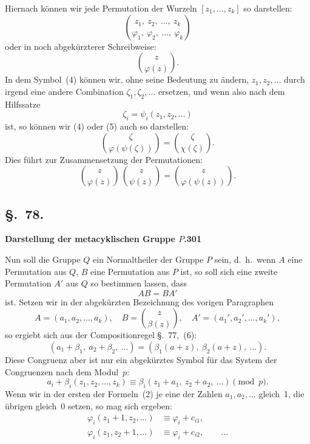 \documentclass[12pt,a4paper]{article}
\begin{document}
Hiernach k\"onnen wir jede Permutation der Wurzeln $[z_1,\ldots,z_k]$ so darstellen:
\begin{equation}
\tag{4}
\binom{z_1,\ z_2,\ \ldots,\ z_k}{\varphi_1,\ \varphi_2,\ \ldots,\ \varphi_k}
\end{equation}
oder in noch abgek\"urzterer Schreibweise:
\begin{equation}
\tag{5}
\binom{z}{\varphi(z)}.
\end{equation}
In dem Symbol~(4) k\"onnen wir, ohne seine Bedeutung zu \"andern, $z_1,z_2,\ldots$ durch irgend eine andere Combination $\zeta_1,\zeta_2,\ldots$ ersetzen, und wenn also nach dem Hilfssatze
\[
\zeta_i = \psi_i(z_1,z_2,\ldots)
\]
ist, so k\"onnen wir (4) oder (5) auch so darstellen:
\[
\binom{\zeta}{\varphi(\psi(\zeta))} = \binom{\zeta}{\chi(\zeta)}.
\]
Dies f\"uhrt zur Zusammensetzung der Permutationen:
\begin{equation}
\tag{6}
\binom{z}{\varphi(z)}\,\binom{z}{\psi(z)} = \binom{z}{\varphi(\psi(z))}.
\end{equation}

\subsection*{\S.~78.}
\textbf{Darstellung der metacyklischen Gruppe $P$.}\hfill\textbf{301}\\[4pt]

Nun soll die Gruppe $Q$ ein Normaltheiler der Gruppe $P$ sein, d.~h.\ wenn $A$ eine Permutation aus $Q$, $B$ eine Permutation aus $P$ ist, so soll sich eine zweite Permutation $A'$ aus $Q$ so bestimmen lassen, dass
\begin{equation}
\tag{1}
AB = BA'
\end{equation}
ist. Setzen wir in der abgek\"urzten Bezeichnung des vorigen Paragraphen
\[
A = (a_1,a_2,\ldots,a_k),\quad B = \binom{z}{\beta(z)},\quad A' = (a_1',a_2',\ldots,a_k'),
\]
so ergiebt sich aus der Compositionregel \S.~77,~(6):
\[
(a_1+\beta_1,\ a_2+\beta_2,\ \ldots) = (\beta_1(a+z),\ \beta_2(a+z),\ \ldots).
\]
Diese Congruenz aber ist nur ein abgek\"urztes Symbol f\"ur das System der Congruenzen nach dem Modul~$p$:
\[
a_i + \beta_i(z_1,z_2,\ldots,z_k) \equiv \beta_i(z_1+a_1,\ z_2+a_2,\ \ldots) \pmod p.
\]
Wenn wir in der ersten der Formeln~(2) je eine der Zahlen $a_1,a_2,\ldots$ gleich~1, die \"ubrigen gleich~0 setzen, so mag sich ergeben:
\begin{equation}
\tag{3}
\begin{aligned}
\varphi_i(z_1+1,z_2,\ldots) &\equiv \varphi_i + c_{i1},\\
\varphi_i(z_1,z_2+1,\ldots) &\equiv \varphi_i + c_{i2},\qquad\ldots
\end{aligned}
\end{equation}
\end{document}
